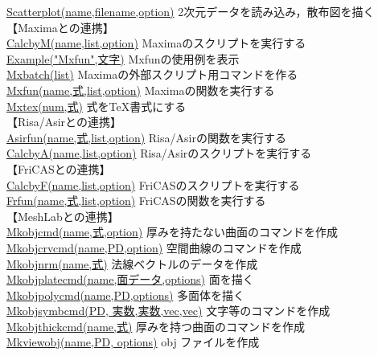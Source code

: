 \documentclass[papersize,a4paper,12pt,uplatex]{jsarticle}
\begin{document}
\begin{tabbing}
\hyperlink{scatterplot}{Scatterplot(name,filename,option)}  \>2次元データを読み込み，散布図を描く\\
\vspace{\baselineskip}
【Maximaとの連携】\\
\hyperlink{calcbyM}{CalcbyM(name,list,option)}  \>Maximaのスクリプトを実行する\\
\hyperlink{example}{Example("Mxfun",文字)}  \>Mxfunの使用例を表示\\
\hyperlink{mxbatch}{Mxbatch(list)}  \>Maximaの外部スクリプト用コマンドを作る\\
\hyperlink{mxfun}{Mxfun(name,式,list,option)}  \>Maximaの関数を実行する\\
\hyperlink{mxtex}{Mxtex(num,式)}  \>式をTeX書式にする\\
\vspace{\baselineskip}
【Risa/Asirとの連携】\\
\hyperlink{asirfun}{Asirfun(name,式,list,option)}  \>Risa/Asirの関数を実行する\\
\hyperlink{calcbyA}{CalcbyA(name,list,option)}  \>Risa/Asirのスクリプトを実行する\\
\vspace{\baselineskip}
【FriCASとの連携】\\
\hyperlink{calcbyF}{CalcbyF(name,list,option)}  \>FriCASのスクリプトを実行する\\
\hyperlink{frfun}{Frfun(name,式,list,option)}  \>FriCASの関数を実行する\\
\vspace{\baselineskip}
【MeshLabとの連携】\\
\hyperlink{mkobjcmd}{Mkobjcmd(name,式,option)} \>厚みを持たない曲面のコマンドを作成\\
\hyperlink{mkobjcrvcmd}{Mkobjcrvcmd(name,PD,option)} \>空間曲線のコマンドを作成\\
\hyperlink{mkobjnrm}{Mkobjnrm(name,式)} \>法線ベクトルのデータを作成\\
\hyperlink{mkobjplatecmd}{Mkobjplatecmd(name,面データ,options)} \>面を描く\\
\hyperlink{mkobjpolycmd}{Mkobjpolycmd(name,PD,options)} \>多面体を描く\\
\hyperlink{mkobjsymbcmd}{Mkobjsymbcmd(PD, 実数,実数,vec,vec)} \>文字等のコマンドを作成\\
\hyperlink{mkobjthickcmd}{Mkobjthickcmd(name,式)} \>厚みを持つ曲面のコマンドを作成\\
\hyperlink{mkviewobj}{Mkviewobj(name,PD, options)} \>obj ファイルを作成\\

\end{tabbing}
\end{document}
